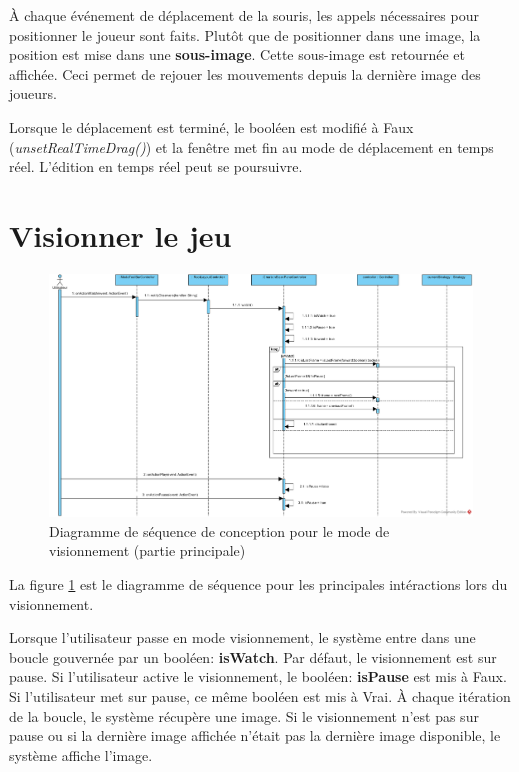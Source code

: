 À chaque événement de déplacement de la souris, les appels nécessaires pour positionner le joueur sont faits.
Plutôt que de positionner dans une image, la position est mise dans une \textbf{sous-image}.
Cette sous-image est retournée et affichée.
Ceci permet de rejouer les mouvements depuis la dernière image des joueurs.

Lorsque le déplacement est terminé, le booléen est modifié à Faux (\textit{unsetRealTimeDrag()}) et la fenêtre met fin au mode de déplacement en temps réel.
L'édition en temps réel peut se poursuivre.

\section{Visionner le jeu}
\label{sec:visionner_jeu}

\begin{figure}[htpb]
    \centering
    \includegraphics[scale=0.38]{fig/dsc_visionnement_watch.png}
    \caption{Diagramme de séquence de conception pour le mode de visionnement (partie principale)}
    \label{fig:dsc_view_main}
\end{figure}

La figure \ref{fig:dsc_view_main} est le diagramme de séquence pour les principales intéractions lors du visionnement.

Lorsque l'utilisateur passe en mode visionnement, le système entre dans une boucle gouvernée par un booléen: \textbf{isWatch}.
Par défaut, le visionnement est sur pause.
Si l'utilisateur active le visionnement, le booléen: \textbf{isPause} est mis à Faux.
Si l'utilisateur met sur pause, ce même booléen est mis à Vrai.
À chaque itération de la boucle, le système récupère une image.
Si le visionnement n'est pas sur pause ou si la dernière image affichée n'était pas la dernière image disponible, le système affiche l'image.

